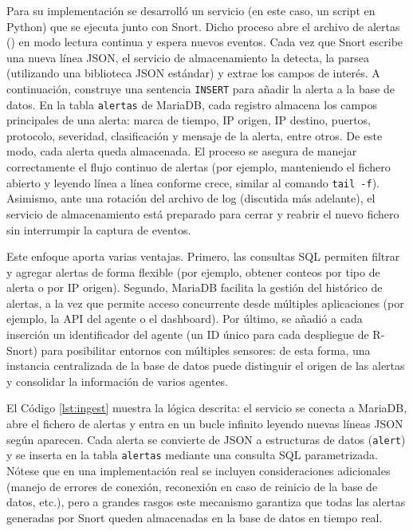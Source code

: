 \documentclass[11pt,a4paper,twoside]{report}
\begin{document}
Para su implementación se desarrolló un servicio (en este caso, un script en Python) que se ejecuta junto con Snort. Dicho proceso abre el archivo de alertas () en modo lectura continua y espera nuevos eventos. Cada vez que Snort escribe una nueva línea JSON, el servicio de almacenamiento la detecta, la parsea (utilizando una biblioteca JSON estándar) y extrae los campos de interés. A continuación, construye una sentencia \texttt{INSERT} para añadir la alerta a la base de datos. En la tabla \texttt{alertas} de MariaDB, cada registro almacena los campos principales de una alerta: marca de tiempo, IP origen, IP destino, puertos, protocolo, severidad, clasificación y mensaje de la alerta, entre otros. De este modo, cada alerta queda almacenada. El proceso se asegura de manejar correctamente el flujo continuo de alertas (por ejemplo, manteniendo el fichero abierto y leyendo línea a línea conforme crece, similar al comando \texttt{tail -f}). Asimismo, ante una rotación del archivo de log (discutida más adelante), el servicio de almacenamiento está preparado para cerrar y reabrir el nuevo fichero sin interrumpir la captura de eventos.\newline

Este enfoque aporta varias ventajas. Primero, las consultas SQL permiten filtrar y agregar alertas de forma flexible (por ejemplo, obtener conteos por tipo de alerta o por IP origen). Segundo, MariaDB facilita la gestión del histórico de alertas, a la vez que permite acceso concurrente desde múltiples aplicaciones (por ejemplo, la API del agente o el dashboard). Por último, se añadió a cada inserción un identificador del agente (un ID único para cada despliegue de R-Snort) para posibilitar entornos con múltiples sensores: de esta forma, una instancia centralizada de la base de datos puede distinguir el origen de las alertas y consolidar la información de varios agentes.\newline

El Código \ref{lst:ingest} muestra la lógica descrita: el servicio se conecta a MariaDB, abre el fichero de alertas y entra en un bucle infinito leyendo nuevas líneas JSON según aparecen. Cada alerta se convierte de JSON a estructuras de datos (\texttt{alert}) y se inserta en la tabla \texttt{alertas} mediante una consulta SQL parametrizada. Nótese que en una implementación real se incluyen consideraciones adicionales (manejo de errores de conexión, reconexión en caso de reinicio de la base de datos, etc.), pero a grandes rasgos este mecanismo garantiza que todas las alertas generadas por Snort queden almacenadas en la base de datos en tiempo real.\newline
\end{document}
